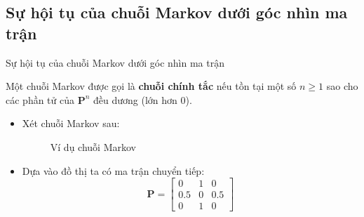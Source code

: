 \subsection{Sự hội tụ của chuỗi Markov dưới góc nhìn ma trận}
\begin{frame}{Sự hội tụ của chuỗi Markov dưới góc nhìn ma trận}
    \begin{mydef*}{}
        Một chuỗi Markov được gọi là \textbf{chuỗi chính tắc} nếu tồn tại một số $n \geq 1$ sao cho các phần tử của $\mathbf{P}^n$ đều dương (lớn hơn 0).
    \end{mydef*}
    \begin{itemize}
        \item[\bullet] Xét chuỗi Markov sau:
\begin{figure}[H]
\centering
{}
\caption{Ví dụ chuỗi Markov} 
\label{fig:grapheg}
\end{figure}

\item[\bullet] Dựa vào đồ thị ta có ma trận chuyển tiếp:
$$
\mathbf{P} = \begin{bmatrix}
    0 & 1 & 0 \\
    0.5 & 0 & 0.5 \\
    0 & 1 & 0
\end{bmatrix}
$$
    \end{itemize}
\end{frame}

